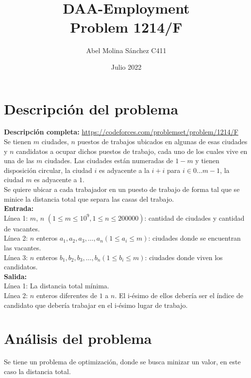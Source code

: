 \documentclass{article}
\title{DAA-Employment\\
 Problem 1214/F}
\author{Abel Molina S\'anchez C411}
\date{Julio 2022}
\begin{document}
\maketitle

\section{Descripci\'on del problema}

\textbf{Descripci\'on completa:} \url{https://codeforces.com/problemset/problem/1214/F}\\

Se tienen $m$ ciudades, $n$ puestos  de trabajos ubicados en algunas de esas ciudades y $n$ candidatos a ocupar dichos puestos de trabajo, cada uno de los cuales vive en una de las $m$ ciudades. Las ciudades est\'an numeradas de $1-m$ y tienen disposici\'on circular, la ciudad $i$ es adyacente a la $i+i$ para $i\in 0...m-1$, la ciudad $m$ es adyacente a $1$.\\
Se quiere ubicar a cada trabajador en un puesto de trabajo de forma tal que se minice la distancia total que separa las casas del trabajo. \\

\textbf{Entrada:}\\

Línea 1: $m$, $n$ $(1\leq m\leq 10^9, 1\leq n\leq 200000)$: cantidad de ciudades y cantidad de vacantes.\\

Línea 2: $n$ enteros $a_1,a_2,a_3,…,a_n (1\leq a_i\leq m)$: ciudades donde se encuentran las vacantes.\\

Línea 3: $n$ enteros $b_1,b_2,b_3,…,b_n (1\leq b_i\leq m)$: ciudades donde viven los candidatos.\\

\textbf{Salida:}\\

Línea 1: La distancia total mínima.\\

Línea 2: $n$ enteros diferentes de $1$ a $n$. El i-ésimo de ellos debería ser el índice de candidato que debería trabajar en el i-ésimo lugar de trabajo.


\section{An\'alisis del problema}

Se tiene un problema de optimizaci\'on, donde se busca minizar un valor, en este caso la distancia total.\\
\end{document}
